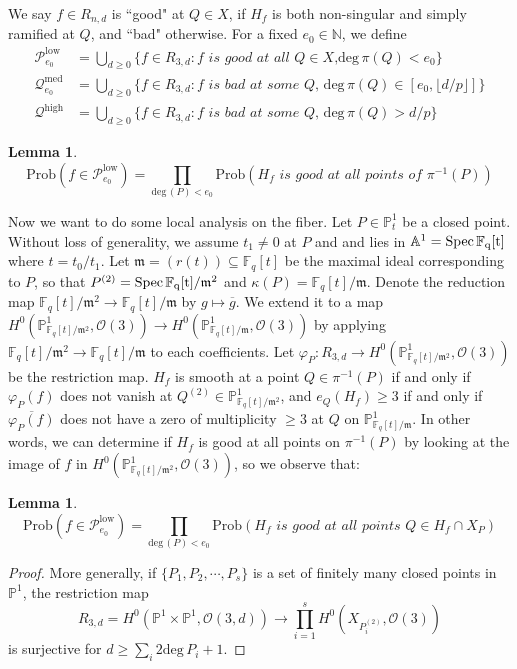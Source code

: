 \documentclass[12pt]{article}
\theoremstyle{plain}
\newtheorem{lemma}[equation]{Lemma}
\theoremstyle{definition}
\newcommand{\fm}{\mathfrak{m}}
\newcommand{\IA}{\mathbb{A}}
\newcommand{\IN}{\mathbb{N}}
\newcommand{\IF}{\mathbb{F}}
\newcommand{\IP}{\mathbb{P}}
\newcommand{\sO}{\mathcal{O}}
\newcommand{\sP}{\mathcal{P}}
\newcommand{\sQ}{\mathcal{Q}}
\renewcommand{\deg}{\mathrm{deg}\,}
\newcommand{\Spec}{\rm Spec\,}
\newcommand\union{\bigcup}
\newcommand\wb{\overline}
\newcommand{\<}{\langle}
\renewcommand{\>}{\rangle}
\newcommand{\Prob}{\mathrm{Prob}}
\begin{document}
We say $f \in R_{n, d}$ is ``good" at $Q \in X$, if $H_f$ is both non-singular and simply ramified at $Q$, and ``bad" otherwise. For a fixed $e_0 \in \IN$, we define 
\begin{align*}
\sP_{e_0}^{\mathrm{low}} &= \union_{d \ge 0} \{ f \in R_{3, d} : f \textit{ is good at all $Q \in X$,}\deg \pi(Q) < e_0\}\\
\sQ_{e_0}^{\mathrm{med}} &= \union_{d \ge 0} \{f \in R_{3, d} : f \textit{ is bad at some $Q$, }\deg \pi(Q) \in [e_0, \lfloor d/p \rfloor]\}\\
\sQ^{\mathrm{high}} &= \union_{d \ge 0} \{f \in R_{3, d} : f \textit{ is bad at some $Q$, }\deg \pi(Q) > d/p\}
\end{align*}

\begin{lemma}
$$\Prob(f \in \sP_{e_0}^{\mathrm{low}}) = \prod_{\deg(P) < e_0} \Prob(H_f \textit{ is good at all points of } \pi^{-1}(P))$$
\end{lemma}

Now we want to do some local analysis on the fiber. Let $P \in \IP^1_t$ be a closed point. Without loss of generality, we assume $t_1 \neq 0$ at $P$ and and lies in $\IA^1 = \Spec \IF_q[t]$ where $t = t_0/t_1$.   Let $\fm = (r(t))\subseteq \IF_q[t]$ be the maximal ideal corresponding to $P$, so that $P^{(2)} = \Spec \IF_q[t]/\fm^2$ and $\kappa(P) = \IF_q[t]/\fm$. Denote the reduction map $\IF_q[t]/\fm^2 \to \IF_q[t]/\fm$ by $g \mapsto \overline{g}$. We extend it to a map $H^0(\IP^1_{\IF_q[t]/\fm^2}, \sO(3)) \to H^0(\IP^1_{\IF_q[t]/\fm}, \sO(3))$ by applying $\IF_q[t]/\fm^2 \to \IF_q[t]/\fm$ to each coefficients. Let $\varphi_P : R_{3, d} \to H^0(\IP^1_{\IF_q[t]/\fm^2}, \sO(3))$ be the restriction map. $H_f$ is smooth at a point $Q \in \pi^{-1}(P)$ if and only if $\varphi_P(f)$ does not vanish at $Q^{(2)} \in \IP^1_{\IF_q[t]/\fm^2}$, and $e_Q(H_f) \ge 3$ if and only if $\wb{\varphi_P(f)}$ does not have a zero of multiplicity $\ge 3$ at $Q$ on $\IP^1_{\IF_q[t]/\fm}$. In other words, we can determine if $H_f$ is good at all points on $\pi^{-1}(P)$ by looking at the image of $f$ in $H^0(\IP^1_{\IF_q[t]/\fm^2}, \sO(3))$, so we observe that:

\begin{lemma}
\label{Low}
$$\Prob(f \in \sP_{e_0}^{\mathrm{low}})  = \prod_{\deg(P) < e_0}  \Prob( H_f \textit{ is good at all points } Q \in H_f \cap X_P ) $$
\end{lemma}
\begin{proof}
More generally, if $\{P_1, P_2, \cdots, P_s\}$ is a set of finitely many closed points in $\IP^1$, the restriction map 
$$ R_{3, d} = H^0(\IP^1 \times \IP^1, \sO(3, d)) \to \prod_{i = 1}^s H^0(X_{P_i^{(2)}}, \sO(3))$$
is surjective for $ d \ge \sum_i 2 \deg P_i + 1$.  
\end{proof}
\end{document}
